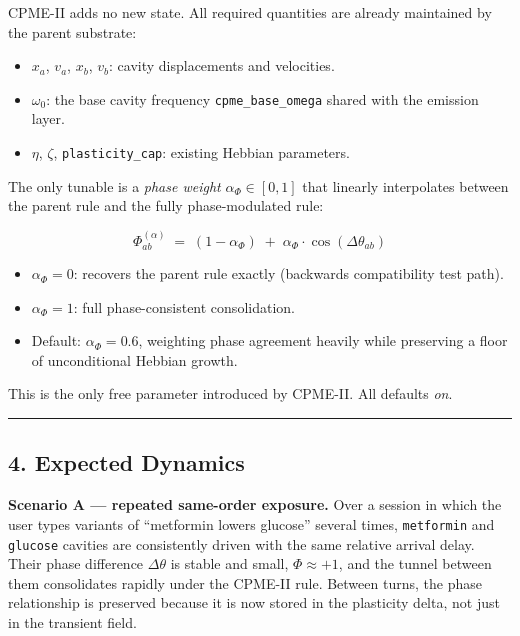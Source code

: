 \documentclass[
  11pt,
  a4paper,
]{article}
\providecommand{\tightlist}{%
  \setlength{\itemsep}{0pt}\setlength{\parskip}{0pt}}
\begin{document}
CPME-II adds no new state. All required quantities are already
maintained by the parent substrate:

\begin{itemize}
\tightlist
\item
  \(x_a\), \(v_a\), \(x_b\), \(v_b\): cavity displacements and
  velocities.
\item
  \(\omega_0\): the base cavity frequency \texttt{cpme\_base\_omega}
  shared with the emission layer.
\item
  \(\eta\), \(\zeta\), \texttt{plasticity\_cap}: existing Hebbian
  parameters.
\end{itemize}

The only tunable is a \emph{phase weight} \(\alpha_\Phi \in [0, 1]\)
that linearly interpolates between the parent rule and the fully
phase-modulated rule:

\[
\Phi_{ab}^{(\alpha)} \;=\; (1 - \alpha_\Phi) \;+\; \alpha_\Phi \cdot \cos(\Delta \theta_{ab})
\]

\begin{itemize}
\tightlist
\item
  \(\alpha_\Phi = 0\): recovers the parent rule exactly (backwards
  compatibility test path).
\item
  \(\alpha_\Phi = 1\): full phase-consistent consolidation.
\item
  Default: \(\alpha_\Phi = 0.6\), weighting phase agreement heavily
  while preserving a floor of unconditional Hebbian growth.
\end{itemize}

This is the only free parameter introduced by CPME-II. All defaults
\emph{on}.

\begin{center}\rule{0.5\linewidth}{0.5pt}\end{center}

\subsection{4. Expected Dynamics}\label{expected-dynamics}

\textbf{Scenario A --- repeated same-order exposure.} Over a session in
which the user types variants of ``metformin lowers glucose'' several
times, \texttt{metformin} and \texttt{glucose} cavities are consistently
driven with the same relative arrival delay. Their phase difference
\(\Delta \theta\) is stable and small, \(\Phi \approx +1\), and the
tunnel between them consolidates rapidly under the CPME-II rule. Between
turns, the phase relationship is preserved because it is now stored in
the plasticity delta, not just in the transient field.
\end{document}
